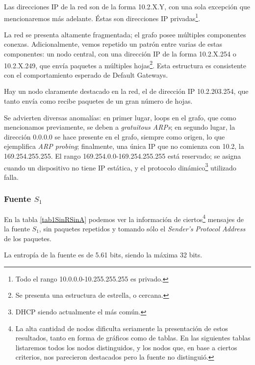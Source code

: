 \par Las direcciones IP de la red son de la forma 10.2.X.Y, con una sola excepción que mencionaremos más adelante.
Éstas son direcciones IP privadas\footnote{Todo el rango 10.0.0.0-10.255.255.255 es privado.}.

\par La red se presenta altamente fragmentada; el grafo posee múltiples componentes conexas.
Adicionalmente, vemos repetido un patrón entre varias de estas componentes: un nodo central, con una dirección IP de la forma 10.2.X.254 o 10.2.X.249, que envía paquetes a múltiples hojas\footnote{Se presenta una estructura de estrella, o cercana.}.
Esta estructura es consistente con el comportamiento esperado de Default Gateways. 

\par Hay un nodo claramente destacado en la red, el de dirección IP 10.2.203.254, que tanto envía como recibe paquetes de un gran número de hojas.

\par Se advierten diversas anomalías: en primer lugar, loops en el grafo, que como mencionamos previamente, se deben a \textit{gratuitous ARPs}; en segundo lugar, la dirección 0.0.0.0 se hace presente en el grafo, siempre como origen, lo que ejemplifica \textit{ARP probing}; finalmente, una única IP que no comienza con 10.2, la 169.254.255.255.
El rango 169.254.0.0-169.254.255.255 está reservado; se asigna cuando un dispositivo no tiene IP estática, y el protocolo dinámico\footnote{DHCP siendo actualmente el más común.} utilizado falla.

\subsubsection{Fuente $S_1$}

\par En la tabla \ref{tab1SinRSinA} podemos ver la información de ciertos\footnote{La alta cantidad de nodos dificulta seriamente la presentación de estos resultados, tanto en forma de gráficos como de tablas.
En las siguientes tablas listaremos todos los nodos distinguidos, y los nodos que, en base a ciertos criterios, nos parecieron destacados pero la fuente no distinguió.} mensajes de la fuente $S_1$, sin paquetes repetidos y tomando sólo el \textit{Sender's Protocol Address} de los paquetes.

\par La entropía de la fuente es de 5.61 bits, siendo la máxima 32 bits. 

